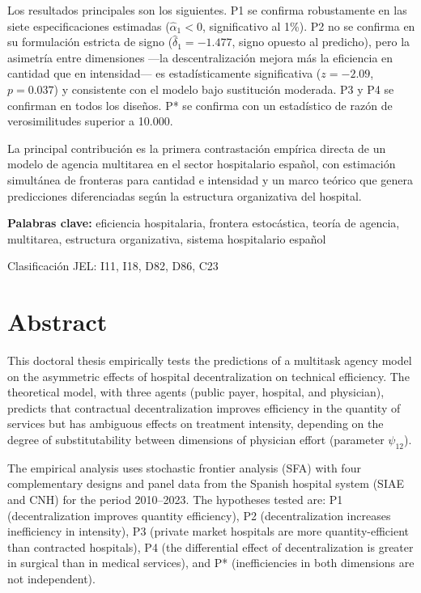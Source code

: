 \documentclass[12pt, a4paper, twoside, openright]{book}
\theoremstyle{plain}
\theoremstyle{definition}
\theoremstyle{remark}
\begin{document}
Los resultados principales son los siguientes. P1 se confirma robustamente en las siete especificaciones estimadas ($\hat{\alpha}_1 < 0$, significativo al 1\%). P2 no se confirma en su formulación estricta de signo ($\hat{\delta}_1 = -1.477$, signo opuesto al predicho), pero la asimetría entre dimensiones ---la descentralización mejora más la eficiencia en cantidad que en intensidad--- es estadísticamente significativa ($z = -2.09$, $p = 0.037$) y consistente con el modelo bajo sustitución moderada. P3 y P4 se confirman en todos los diseños. P* se confirma con un estadístico de razón de verosimilitudes superior a 10.000.

La principal contribución es la primera contrastación empírica directa de un modelo de agencia multitarea en el sector hospitalario español, con estimación simultánea de fronteras para cantidad e intensidad y un marco teórico que genera predicciones diferenciadas según la estructura organizativa del hospital.

\medskip
\noindent\textbf{Palabras clave:} eficiencia hospitalaria, frontera estocástica, teoría de agencia, multitarea, estructura organizativa, sistema hospitalario español

\medskip
\noindent Clasificación JEL: I11, I18, D82, D86, C23

\chapter*{Abstract}

This doctoral thesis empirically tests the predictions of a multitask agency model on the asymmetric effects of hospital decentralization on technical efficiency. The theoretical model, with three agents (public payer, hospital, and physician), predicts that contractual decentralization improves efficiency in the quantity of services but has ambiguous effects on treatment intensity, depending on the degree of substitutability between dimensions of physician effort (parameter $\psi_{12}$).

The empirical analysis uses stochastic frontier analysis (SFA) with four complementary designs and panel data from the Spanish hospital system (SIAE and CNH) for the period 2010--2023. The hypotheses tested are: P1 (decentralization improves quantity efficiency), P2 (decentralization increases inefficiency in intensity), P3 (private market hospitals are more quantity-efficient than contracted hospitals), P4 (the differential effect of decentralization is greater in surgical than in medical services), and P* (inefficiencies in both dimensions are not independent).
\end{document}
